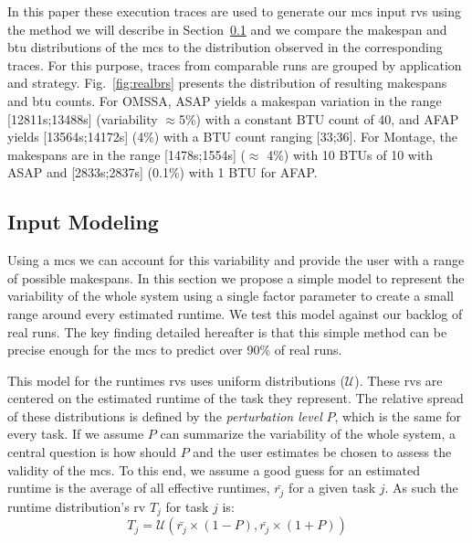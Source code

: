 \documentclass[]{llncs}
\begin{document}
In this  paper these execution  traces are used  to generate our  \ac{mcs} input
\acp{rv}  using the  method  we  will describe  in  Section~\ref{sec:im} and  we
compare  the  makespan  and  \ac{btu}  distributions  of  the  \ac{mcs}  to  the
distribution observed in the corresponding traces. For this purpose, traces from
comparable    runs     are    grouped     by    application     and    strategy.
Fig.~\ref{fig:realbrs} presents  the distribution  of resulting  makespans and
\ac{btu}  counts.  For  OMSSA, ASAP  yields a  makespan variation  in the  range
[12811s;13488s] (variability $\approx$5\%) with a  constant BTU  count of 40,  and AFAP
yields [13564s;14172s] (4\%) with a BTU  count ranging [33;36]. For Montage, the
makespans are in the range [1478s;1554s] ($\approx$ 4\%) with 10 BTUs of 10 with ASAP and
[2833s;2837s] (0.1\%) with 1 BTU for AFAP.


\subsection{Input Modeling}\label{sec:im}


Using a  \ac{mcs} we can account for this  variability and provide the
user with  a range of  possible makespans. In this  section we propose  a simple
model to  represent the variability of  the whole system using a single factor
parameter to create  a small range around every estimated  runtime. We test this %
model against our backlog of real runs. The key finding detailed hereafter is
that this simple method  can be precise enough for the  \ac{mcs} to predict over
90\% of real runs.

This model for the runtimes \acp{rv} uses uniform distributions ($\mathcal{U}$). 
These \acp{rv} are centered on the estimated runtime of the task they represent.
The relative spread of these distributions is defined by the \emph{perturbation
level} $P$, which is the same for every task.  If we assume $P$ can summarize
the variability of the whole system, a central question is how should $P$ and
the user estimates be chosen to assess the validity of the \ac{mcs}. To this
end, we assume a good guess for an  estimated runtime is the  average of all
effective runtimes, $\bar{r_j}$ for a given task $j$. As such the runtime
distribution's \ac{rv} $T_j$ for task $j$ is: 
\begin{equation} 
	T_j = \mathcal{U}(\bar{r_j}\times(1-P), \bar{r_j}\times(1+P))
\end{equation}
\end{document}
